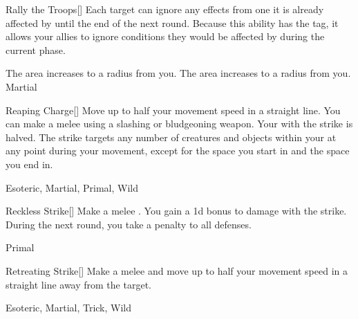 \lowercase{\hypertarget{maneuver:Rally the Troops}{}}\label{maneuver:Rally the Troops}
\hypertarget{maneuver:Rally the Troops}{}
\begin{freeability}[Rank 2]{Rally the Troops}[]
Each target can ignore any effects from one  it is already affected by until the end of the next round.
Because this ability has the  tag, it allows your allies to ignore conditions they would be affected by during the current phase.

\rankline
{} The area increases to a \arealarge radius from you.
 The area increases to a \areahuge radius from you.
 Martial
\end{freeability}
\vspace{0.25em}



\lowercase{\hypertarget{maneuver:Reaping Charge}{}}\label{maneuver:Reaping Charge}
\hypertarget{maneuver:Reaping Charge}{}
\begin{freeability}[Rank 2]{Reaping Charge}[]
Move up to half your movement speed in a straight line.
You can make a melee  using a slashing or bludgeoning weapon.
Your  with the strike is halved.
The strike targets any number of creatures and objects within your  at any point during your movement, except for the space you start in and the space you end in.


 Esoteric, Martial, Primal, Wild
\end{freeability}
\vspace{0.25em}



\lowercase{\hypertarget{maneuver:Reckless Strike}{}}\label{maneuver:Reckless Strike}
\hypertarget{maneuver:Reckless Strike}{}
\begin{freeability}[Rank 2]{Reckless Strike}[]
Make a melee .
You gain a \plus1d bonus to damage with the strike.
During the next round, you take a  penalty to all defenses.


 Primal
\end{freeability}
\vspace{0.25em}



\lowercase{\hypertarget{maneuver:Retreating Strike}{}}\label{maneuver:Retreating Strike}
\hypertarget{maneuver:Retreating Strike}{}
\begin{freeability}[Rank 2]{Retreating Strike}[]
Make a melee  and move up to half your movement speed in a straight line away from the target.


 Esoteric, Martial, Trick, Wild
\end{freeability}
\vspace{0.25em}




